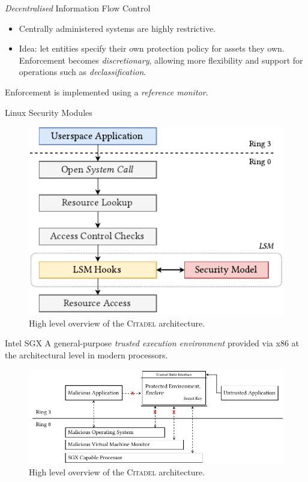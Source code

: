 \documentclass[xcolor=dvipsnames]{beamer}
\begin{document}
\begin{frame}{\textit{Decentralised} Information Flow Control}
    \begin{itemize}
        \item Centrally administered systems are highly restrictive.
        \vspace{5mm}
        \item Idea: let entities specify their own protection policy for assets they own. Enforcement becomes \textit{discretionary}, allowing more flexibility and support for operations such as \textit{declassification}.
    \end{itemize}
    \vspace{5mm}
    Enforcement is implemented using a \textit{reference monitor}.
\end{frame}

\begin{frame}{Linux Security Modules}

    \begin{figure}[]
        \centering
        \includegraphics[width=0.6\linewidth]{../figures/LSM.pdf}
        \vspace{5mm}
        \caption{High level overview of the \textsc{Citadel} architecture.}
        \label{fig:citadel-overview}
    \end{figure}

\end{frame}

\begin{frame}{Intel SGX}
    A general-purpose \textit{trusted execution environment} provided via x86 at the architectural level in modern processors.
    \vspace{5mm}
    \begin{figure}[]
        \centering
        \includegraphics[width=0.99\linewidth]{../figures/SGX-architecture.pdf}
        \vspace{5mm}
        \caption{High level overview of the \textsc{Citadel} architecture.}
        \label{fig:citadel-overview}
    \end{figure}
\end{frame}
\end{document}
